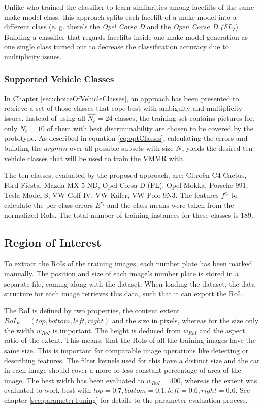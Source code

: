 Unlike \citep{siddiqui2015robust} who trained the classifier to learn similarities among facelifts of the same make-model class, this approach splits each facelift of a make-model into a different class (e. g. there's the \emph{Opel Corsa D} and the \emph{Open Corsa D (FL)}). Building a classifier that regards facelifts inside one make-model generation as one single class turned out to decrease the classification accuracy due to multiplicity issues.

\subsubsection{Supported Vehicle Classes}\label{sec:supportedVehicleClassesImpl}
In Chapter \ref{sec:choiceOfVehicleClasses}, an approach has been presented to retrieve a set of those classes that cope best with ambiguity and multiplicity issues. Instead of using all $\hat{N_c} = 24$ classes, the training set contains pictures for, only $N_c = 10$ of them with best discriminability are chosen to be covered by the prototype. As described in equation \ref{eq:optClasses}, calculating the errors and building the $argmin$ over all possible subsets with size $N_c$ yields the desired ten vehicle classes that will be used to train the VMMR with.

The ten classes, evaluated by the proposed approach, are: Citro\"en C4 Cactus, Ford Fiesta, Mazda MX-5 ND, Opel Corsa D (FL), Opel Mokka, Porsche 991, Tesla Model S, VW Golf IV, VW K\"afer, VW Polo 9N3. The features $f^{c_i}$ to calculate the per-class errors $E^{c_i}$ and the class means were taken from the normalized RoIs. The total number of training instances for these classes is 189.

\subsection{Region of Interest}
To extract the RoIs of the training images, each number plate has been marked manually. The position and size of each image's number plate is stored in a separate file, coming along with the dataset. When loading the dataset, the data structure for each image retrieves this data, such that it can export the RoI.

The RoI is defined by two properties, the content extent $RoI_E = (top, bottom, left, right)$ and the size in pixels, whereas for the size only the width $w_{RoI}$ is important. The height is deduced from $w_{RoI}$ and the aspect ratio of the extent. This means, that the RoIs of all the training images have the same size. This is important for comparable image operations like detecting or describing features. The filter kernels used for this have a distinct size and the car in each image should cover a more or less constant percentage of area of the image. The best width has been evaluated to $w_{RoI} = 400$, whereas the extent was evaluated to work best with $top = 0.7, bottom = 0.1, left = 0.6, right = 0.6$. See chapter \ref{sec:parameterTuning} for details to the parameter evaluation process.


